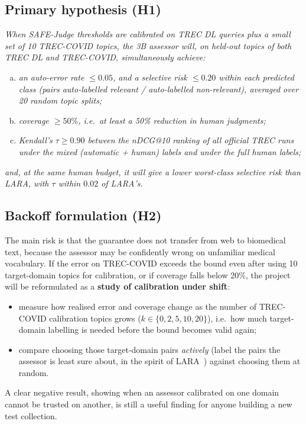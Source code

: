 \documentclass[11pt,a4paper]{article}
\begin{document}
\subsection{Primary hypothesis (H1)}
\emph{When SAFE-Judge thresholds are calibrated on TREC DL queries plus a small set of 10 TREC-COVID topics, the 3B assessor will, on held-out topics of both TREC DL and TREC-COVID, simultaneously achieve:}
\begin{enumerate}[(a)]
  \item \emph{an auto-error rate $\le 0.05$, and a selective risk $\le 0.20$ within each predicted class (pairs auto-labelled relevant / auto-labelled non-relevant), averaged over 20 random topic splits;}
  \item \emph{coverage $\ge 50\%$, i.e.\ at least a 50\% reduction in human judgments;}
  \item \emph{Kendall's $\tau \ge 0.90$ between the nDCG@10 ranking of all official TREC runs under the mixed (automatic + human) labels and under the full human labels;}
\end{enumerate}
\emph{and, at the same human budget, it will give a lower worst-class selective risk than LARA, with $\tau$ within $0.02$ of LARA's.}


\subsection{Backoff formulation (H2)}
The main risk is that the guarantee does not transfer from web to biomedical text, because the assessor may be confidently wrong on unfamiliar medical vocabulary. If the error on TREC-COVID exceeds the bound even after using 10 target-domain topics for calibration, or if coverage falls below 20\%, the project will be reformulated as a \textbf{study of calibration under shift}:
\begin{itemize}
  \item measure how realised error and coverage change as the number of TREC-COVID calibration topics grows ($k\in\{0,2,5,10,20\}$), i.e.\ how much target-domain labelling is needed before the bound becomes valid again;
  \item compare choosing those target-domain pairs \emph{actively} (label the pairs the assessor is least sure about, in the spirit of LARA~\cite{lara2025}) against choosing them at random.
\end{itemize}
A clear negative result, showing when an assessor calibrated on one domain cannot be trusted on another, is still a useful finding for anyone building a new test collection.
\end{document}
